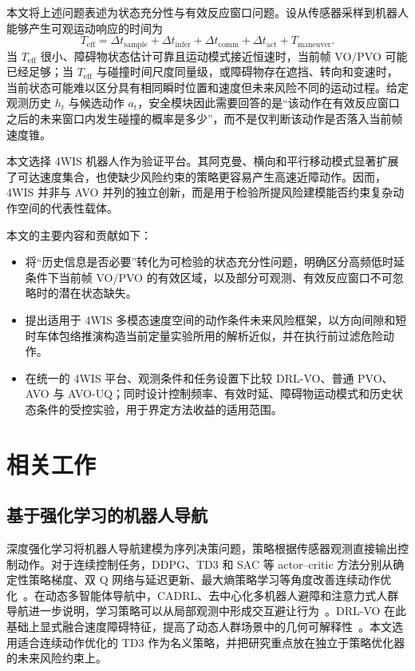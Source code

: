 \documentclass[UTF8,10pt,a4paper,twocolumn]{ctexart}
\begin{document}
本文将上述问题表述为状态充分性与有效反应窗口问题。设从传感器采样到机器人能够产生可观运动响应的时间为
\begin{equation}
    T_{\mathrm{eff}}=\Delta t_{\mathrm{sample}}+\Delta t_{\mathrm{infer}}+\Delta t_{\mathrm{comm}}+\Delta t_{\mathrm{act}}+T_{\mathrm{maneuver}}.
    \label{eq:effective_window}
\end{equation}
当 $T_{\mathrm{eff}}$ 很小、障碍物状态估计可靠且运动模式接近恒速时，当前帧 VO/PVO 可能已经足够；当 $T_{\mathrm{eff}}$ 与碰撞时间尺度同量级，或障碍物存在遮挡、转向和变速时，当前状态可能难以区分具有相同瞬时位置和速度但未来风险不同的运动过程。给定观测历史 $h_t$ 与候选动作 $a_t$，安全模块因此需要回答的是“该动作在有效反应窗口之后的未来窗口内发生碰撞的概率是多少”，而不是仅判断该动作是否落入当前帧速度锥。

本文选择 4WIS 机器人作为验证平台。其阿克曼、横向和平行移动模式显著扩展了可达速度集合，也使缺少风险约束的策略更容易产生高速近障动作。因而，4WIS 并非与 AVO 并列的独立创新，而是用于检验所提风险建模能否约束复杂动作空间的代表性载体。

本文的主要内容和贡献如下：
\begin{itemize}
    \item 将“历史信息是否必要”转化为可检验的状态充分性问题，明确区分高频低时延条件下当前帧 VO/PVO 的有效区域，以及部分可观测、有效反应窗口不可忽略时的潜在状态缺失。
    \item 提出适用于 4WIS 多模态速度空间的动作条件未来风险框架，以方向间隙和短时车体包络推演构造当前定量实验所用的解析近似，并在执行前过滤危险动作。
    \item 在统一的 4WIS 平台、观测条件和任务设置下比较 DRL-VO、普通 PVO、AVO 与 AVO-UQ；同时设计控制频率、有效时延、障碍物运动模式和历史状态条件的受控实验，用于界定方法收益的适用范围。
\end{itemize}

\section{相关工作}

\subsection{基于强化学习的机器人导航}

深度强化学习将机器人导航建模为序列决策问题，策略根据传感器观测直接输出控制动作。对于连续控制任务，DDPG、TD3 和 SAC 等 actor--critic 方法分别从确定性策略梯度、双 Q 网络与延迟更新、最大熵策略学习等角度改善连续动作优化~\cite{lillicrap2016ddpg,fujimoto2018td3,haarnoja2018sac}。在动态多智能体导航中，CADRL、去中心化多机器人避障和注意力式人群导航进一步说明，学习策略可以从局部观测中形成交互避让行为~\cite{chen2017cadrl,long2018decentralized,chen2019sarl,fan2020multirobot}。DRL-VO 在此基础上显式融合速度障碍特征，提高了动态人群场景中的几何可解释性~\cite{xie2023drlvo}。本文选用适合连续动作优化的 TD3 作为名义策略，并把研究重点放在独立于策略优化器的未来风险约束上。
\end{document}
